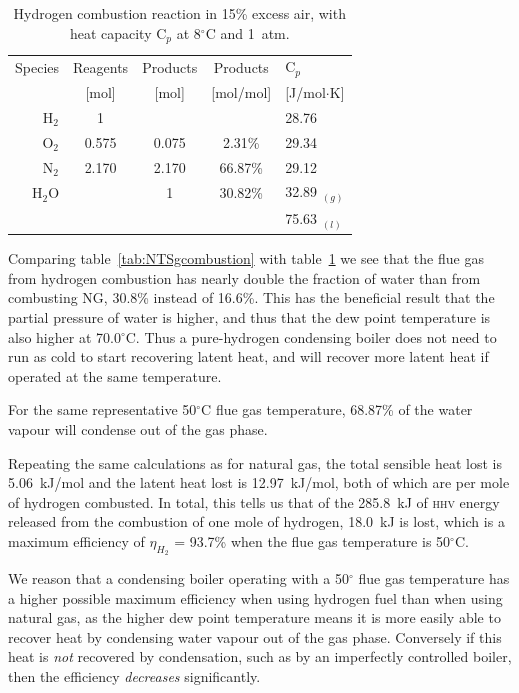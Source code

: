 \documentclass[5p]{elsarticle} %
\begin{document}
\begin{table}[ht]
    \centering
    \begin{tabular}{r|ccc|l}
         Species & Reagents & Products & Products & C$_p$\\
         & {\small[mol]} & {\small[mol]} & {\small[mol/mol]}&  {\small[J/mol$\cdot$K]}\\
         \hline
         H$_2$ & 1 & & & 28.76 \\
         O$_2$ & 0.575 & 0.075 & 2.31\% & 29.34 \\
         N$_2$ & 2.170 & 2.170 & 66.87\% & 29.12 \\
         H$_2$O & & 1 & 30.82\% & 32.89 $_{(g)}$ \\
         & &  &  & 75.63 $_{(l)}$ \\
    \end{tabular}
    \caption{Hydrogen combustion reaction in 15\% excess air, with heat capacity C$_p$\citep{Huber2022} at 8$^\circ$C and 1~atm.}
    \label{tab:hydrogencombustion}
\end{table}

Comparing table~\ref{tab:NTSgcombustion} with table~\ref{tab:hydrogencombustion} we see that the flue gas from hydrogen combustion has nearly double the fraction of water than from combusting NG, 30.8\% instead of 16.6\%.
This has the beneficial result that the partial pressure of water is higher, and thus that the dew point temperature is also higher at 70.0$^\circ$C.
Thus a pure-hydrogen condensing boiler does not need to run as cold to start recovering latent heat, and will recover more latent heat if operated at the same temperature.

For the same representative 50$^\circ$C flue gas temperature, 68.87\% of the water vapour will condense out of the gas phase. 

Repeating the same calculations 
as
for natural gas, the total sensible heat lost is 5.06~kJ/mol and the latent heat lost is 12.97~kJ/mol, both of which are per mole of hydrogen combusted.
In total, this tells us that of the 285.8~kJ of \textsc{hhv} energy released from the combustion of one mole of hydrogen, 18.0~kJ is lost, which is a maximum efficiency of $\eta_{H_2}$ = 93.7\% when the flue gas temperature is 50$^{\circ}$C.

We reason that a condensing boiler operating with a 50$^\circ$ flue gas temperature has a higher possible maximum efficiency when using hydrogen fuel than when using natural gas, as the higher dew point temperature means it is more easily able to recover heat by condensing water vapour out of the gas phase.
Conversely if this heat is \emph{not} recovered by condensation, such as by an imperfectly controlled boiler, then the efficiency \emph{decreases} significantly.
\end{document}
